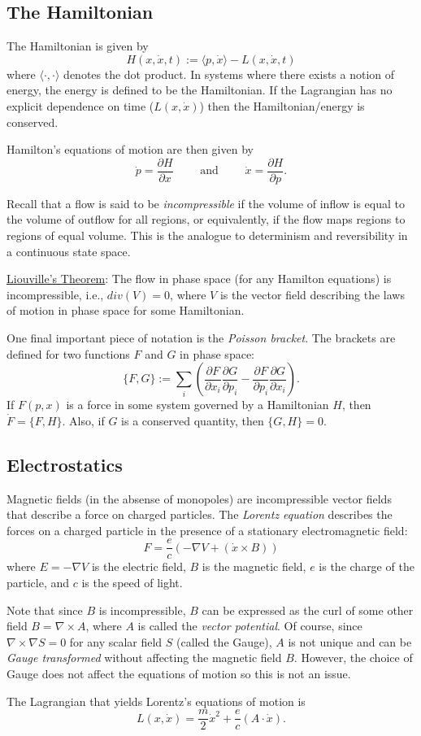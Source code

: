 \documentclass[12pt]{article}
\begin{document}
\subsection*{The Hamiltonian}

The Hamiltonian is given by
$$
H(x, \dot{x}, t) := \langle p, \dot{x} \rangle - L(x, \dot{x}, t)
$$
where $\langle \cdot , \cdot \rangle$ denotes the dot product.
In systems where there exists a notion of energy, the energy is defined
to be the Hamiltonian.
If the Lagrangian has no explicit dependence on time ($L(x, \dot{x})$) then
the Hamiltonian/energy is conserved.

Hamilton's equations of motion are then given by
$$
\dot{p} = \frac{\partial H}{\partial x} \qquad\text{ and }\qquad
\dot{x} = \frac{\partial H}{\partial p}.
$$

Recall that a flow is said to be {\it incompressible} if the volume of inflow
is equal to the volume of outflow for all regions, or equivalently, if 
the flow maps regions to regions of equal volume.
This is the analogue to determinism and reversibility in a continuous state
space.

\underline{Liouville's Theorem}: The flow in phase space (for any Hamilton
equations) is incompressible, i.e., $div(V) = 0$, where $V$ is the vector field
describing the laws of motion in phase space for some Hamiltonian.

One final important piece of notation is the {\it Poisson bracket}.
The brackets are defined for two functions $F$ and $G$ in phase space:
$$
\{F,G\} := \sum_i \left(
\frac{\partial F}{\partial x_i}\frac{\partial G}{\partial p_i} -
\frac{\partial F}{\partial p_i}\frac{\partial G}{\partial x_i} \right).
$$
If $F(p,x)$ is a force in some system governed by a Hamiltonian $H$, then 
$\dot{F} = \{F, H\}$.
Also, if $G$ is a conserved quantity, then $\{G, H\} = 0$.

\subsection*{Electrostatics}

Magnetic fields (in the absense of monopoles) are incompressible 
vector fields that describe a force on charged particles.
The {\it Lorentz equation} describes the forces on a charged particle in
the presence of a stationary electromagnetic field:
$$
F = \frac{e}{c}\left(-\nabla V + (\dot{x} \times B)\right)
$$
where $E = -\nabla V$ is the electric field, $B$ is the magnetic field,
$e$ is the charge of the particle, and $c$ is the speed of light.

Note that since $B$ is incompressible, $B$ can be expressed as the curl
of some other field $B = \nabla \times A$, where $A$ is called the
{\it vector potential}.
Of course, since $\nabla \times \nabla S = 0$ for any scalar field $S$
(called the Gauge),
$A$ is not unique and can be {\it Gauge transformed} without affecting
the magnetic field $B$.
However, the choice of Gauge does not affect the equations of motion so
this is not an issue.

The Lagrangian that yields Lorentz's equations of motion is
$$
L(x, \dot{x}) = \frac{m}{2}\dot{x}^2 + \frac{e}{c}(A \cdot \dot{x}).
$$
\end{document}
